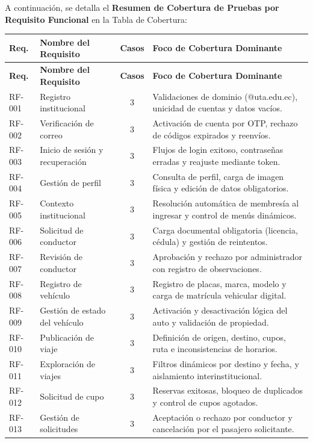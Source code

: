 \documentclass{article}
\begin{document}
A continuación, se detalla el \textbf{Resumen de Cobertura de Pruebas por Requisito Funcional} en la Tabla de Cobertura:

\begin{longtable}{|P{1.6cm}|P{4.2cm}|c|P{7.2cm}|}
\hline
{}
\textbf{Req.} & \textbf{Nombre del Requisito} & \textbf{Casos} & \textbf{Foco de Cobertura Dominante} \\
\hline
\endfirsthead
\hline
{}
\textbf{Req.} & \textbf{Nombre del Requisito} & \textbf{Casos} & \textbf{Foco de Cobertura Dominante} \\
\hline
\endhead
RF-001 & Registro institucional & 3 & Validaciones de dominio (@uta.edu.ec), unicidad de cuentas y datos vacíos. \\
\hline
RF-002 & Verificación de correo & 3 & Activación de cuenta por OTP, rechazo de códigos expirados y reenvíos. \\
\hline
RF-003 & Inicio de sesión y recuperación & 3 & Flujos de login exitoso, contraseñas erradas y reajuste mediante token. \\
\hline
RF-004 & Gestión de perfil & 3 & Consulta de perfil, carga de imagen física y edición de datos obligatorios. \\
\hline
RF-005 & Contexto institucional & 3 & Resolución automática de membresía al ingresar y control de menús dinámicos. \\
\hline
RF-006 & Solicitud de conductor & 3 & Carga documental obligatoria (licencia, cédula) y gestión de reintentos. \\
\hline
RF-007 & Revisión de conductor & 3 & Aprobación y rechazo por administrador con registro de observaciones. \\
\hline
RF-008 & Registro de vehículo & 3 & Registro de placas, marca, modelo y carga de matrícula vehicular digital. \\
\hline
RF-009 & Gestión de estado del vehículo & 3 & Activación y desactivación lógica del auto y validación de propiedad. \\
\hline
RF-010 & Publicación de viaje & 3 & Definición de origen, destino, cupos, ruta e inconsistencias de horarios. \\
\hline
RF-011 & Exploración de viajes & 3 & Filtros dinámicos por destino y fecha, y aislamiento interinstitucional. \\
\hline
RF-012 & Solicitud de cupo & 3 & Reservas exitosas, bloqueo de duplicados y control de cupos agotados. \\
\hline
RF-013 & Gestión de solicitudes & 3 & Aceptación o rechazo por conductor y cancelación por el pasajero solicitante. \\

\end{longtable}
\end{document}
